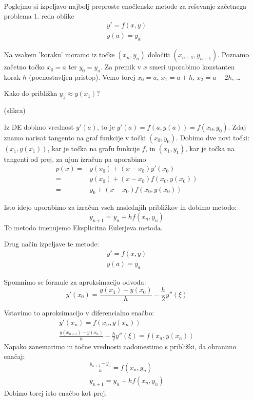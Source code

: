 \documentclass[a4paper,12pt]{article}
\theoremstyle{definition}
\theoremstyle{remark}
\begin{document}
Poglejmo si izpeljavo najbolj preproste enočlenske metode za reševanje začetnega problema 1. reda oblike
\begin{gather*}
    y' = f(x, y) \\
    y(a) = y_a
\end{gather*}

Na vsakem 'koraku' moramo iz točke $(x_n, y_n)$ določiti $(x_{n+1}, y_{n+1})$. Poznamo začetno točko $x_0 = a$ ter $y_0 = y_a$. Za premik v $x$ smeri
uporabimo konstanten korak $h$ (poenostavljen pristop). Vemo torej $x_0 = a$, $x_1 = a+h$, $x_2 = a-2h$, \dots

Kako do približka $y_1 \approx y(x_1)$?

(slikca)

Iz DE dobimo vrednost $y'(a)$, to je $y'(a) = f(a, y(a)) = f(x_0, y_0)$. Zdaj znamo narisat tangento na graf funkcije v točki $(x_0, y_0)$. Dobimo 
dve novi točki: $(x_1, y(x_1))$, kar je točka na grafu funkcije $f$, in $(x_1, y_1)$, kar je točka na tangenti od prej, za njun izračun pa uporabimo
\begin{align*}
    p(x) =& y(x_0) + (x-x_0)y'(x_0) \\
         =& y(x_0) + (x-x_0)f(x_0, y(x_0)) \\
         =& y_0 + (x-x_0)f(x_0, y(x_0))
\end{align*}

Isto idejo uporabimo za izračun vseh naslednjih približkov in dobimo metodo:
\begin{equation*}
    y_{n+1} = y_n + h f(x_n, y_n)
\end{equation*}
To metodo imenujemo Eksplicitna Eulerjeva metoda.

Drug način izpeljave te metode:
\begin{gather*}
    y' = f(x, y) \\
    y(a) = y_a
\end{gather*}

Spomnimo se formule za aproksimacijo odvoda:
\begin{equation*}
    y'(x_0) = \frac{y(x_1) - y(x_0)}{h} - \frac{h}{2} y''(\xi)
\end{equation*}

Vstavimo to aproksimacijo v diferencialno enačbo:
\begin{gather*}
    y'(x_n) = f(x_n, y(x_n)) \\
    \frac{y(x_{n+1}) - y(x_n)}{h} - \frac{h}{2} y''(\xi) = f(x_n, y(x_n))
\end{gather*}
Napako zanemarimo in točne vrednosti nadomestimo s približki, da ohranimo enačaj:
\begin{gather*}
    \frac{y_{n+1}- y_n}{h} = f(x_n, y_n) \\
    y_{n+1} = y_n + h f(x_n, y_n)
\end{gather*}
Dobimo torej isto enačbo kot prej.
\end{document}

